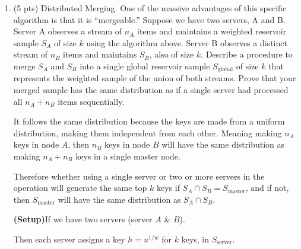 \documentclass[11pt]{article}
\begin{document}
\begin{enumerate}[label=(\alph*)]
\[
\text{where all all weights}
\]

\[
W=\sum_{j=1}^{n} w_j
\]

\[
\text{we want }\Pr(k_i>k_j\ \forall j\ne i)
\]

\[
\text{* }k_{\max}\text{ is } \max(k_j)\ \text{that isn't } k_i\ \text{(setup/valid?)}
\]

\[
\text{then really want }
\Pr(u_i>u_{\max})
=
\Pr(i\ \text{is max})
\]

\[
=
\int_{0}^{1}\Pr(u_j<y\ \forall j\ne i)
\]

\[
=
\int_{0}^{1}\prod_{j\ne i}\Pr(u_j<y)\cdot f_i(y)\,dy
\qquad \text{* from part A}
\]

\[
=
\int_{0}^{1}\left(\prod_{j\ne i} y^{w_j}\right)\cdot w_i\,y^{w_i-1}\,dy
=
\int_{0}^{1} w_i\,y^{W-1}\,dy
\]

\[
=
w_i\cdot \frac{1}{W}
=
\frac{w_i}{\sum_{j=1}^{n} w_j}
\ \ \square
\]

	\item (5 pts) Distributed Merging. One of the massive advantages of this specific algorithm is that it is ``mergeable.'' Suppose we have two servers, A and B. Server A observes a stream of $n_A$ items and maintains a weighted reservoir sample $S_A$ of size $k$ using the algorithm above. Server B observes a distinct stream of $n_B$ items and maintains $S_B$, also of size $k$. Describe a procedure to merge $S_A$ and $S_B$ into a single global reservoir sample $S_{\text{global}}$ of size $k$ that represents the weighted sample of the union of both streams. Prove that your merged sample has the same distribution as if a single server had processed all $n_A+n_B$ items sequentially.


It follows the same distribution because the keys are made from a uniform distribution, making them independent from each other. Meaning making $n_A$ keys in node $A$, then $n_B$ keys in node $B$ will have the same distribution as making $n_A+n_B$ keys in a single master node.

Therefore whether using a single server or two or more servers in the operation will generate the same top $k$ keys if $S_A \cap S_B = S_{\text{master}}$, and if not, then $S_{\text{master}}$ will have the same distribution as $S_A \cap S_B$.

\vspace{1em}

\textbf{(Setup)}\quad If we have two servers (server $A$ \& $B$).

Then each server assigns a key $h=u^{1/w}$ for $k$ keys, in $S_{\text{server}}$.


\end{enumerate}
\end{document}
